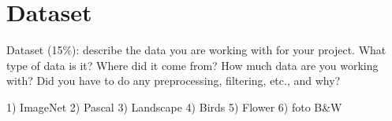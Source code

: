 \section{Dataset}
Dataset (15\%): describe the data you are working with for your project.
What type of data is it? Where did it come from? How much data are you working with?
Did you have to do any preprocessing, filtering, etc., and why?

1) ImageNet
2) Pascal
3) Landscape
4) Birds
5) Flower
6) foto B&W